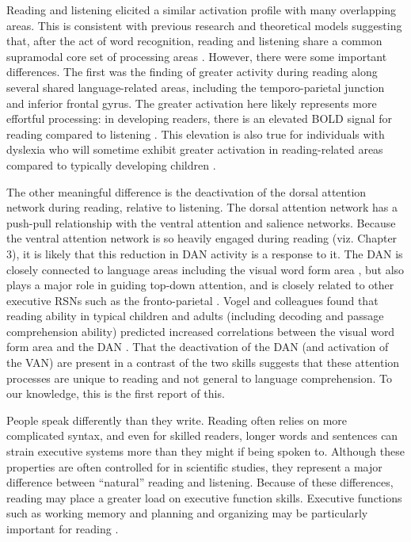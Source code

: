 Reading and listening elicited a similar activation profile with many overlapping areas. This is consistent with previous research and theoretical models suggesting that, after the act of word recognition, reading and listening share a common supramodal core set of processing areas \citep{Rueckl2015, Hoover1990, Price2012}. However, there were some important differences. The first was the finding of greater activity during reading along several shared language-related areas, including the temporo-parietal junction and inferior frontal gyrus. The greater activation here likely represents more effortful processing: in developing readers, there is an elevated BOLD signal for reading compared to listening \citep{Berl2011}. This elevation is also true for individuals with dyslexia who will sometime exhibit greater activation in reading-related areas compared to typically developing children \citep{Pugh2000}. 

The other meaningful difference is the deactivation of the dorsal attention network during reading, relative to listening. The dorsal attention network has a push-pull relationship with the ventral attention and salience networks. Because the ventral attention network is so heavily engaged during reading (viz. Chapter 3), it is likely that this reduction in DAN activity is a response to it. The DAN is closely connected to language areas including the visual word form area \citep{Bouhali2014}, but also plays a major role in guiding top-down attention, and is closely related to other executive RSNs such as the fronto-parietal \citep{Vogel2014}. Vogel and colleagues found that reading ability in typical children and adults (including decoding and passage comprehension ability) predicted increased correlations between the visual word form area and the DAN \citep{Vogel2012a}. That the deactivation of the DAN (and activation of the VAN) are present in a contrast of the two skills suggests that these attention processes are unique to reading and not general to language comprehension. To our knowledge, this is the first report of this.

People speak differently than they write. Reading often relies on more complicated syntax, and even for skilled readers, longer words and sentences can strain executive systems more than they might if being spoken to. Although these properties are often controlled for in scientific studies, they represent a major difference between “natural” reading and listening. Because of these differences, reading may place a greater load on executive function skills. Executive functions such as working memory and planning and organizing may be particularly important for reading \citep{Cain2006}.  


